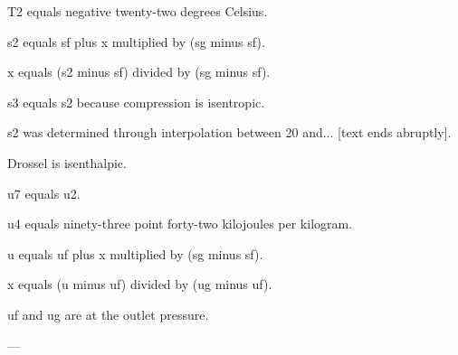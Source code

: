 T2 equals negative twenty-two degrees Celsius.  

s2 equals sf plus x multiplied by (sg minus sf).  

x equals (s2 minus sf) divided by (sg minus sf).  

s3 equals s2 because compression is isentropic.  

s2 was determined through interpolation between 20 and... [text ends abruptly].  

Drossel is isenthalpic.  

u7 equals u2.  

u4 equals ninety-three point forty-two kilojoules per kilogram.  

u equals uf plus x multiplied by (sg minus sf).  

x equals (u minus uf) divided by (ug minus uf).  

uf and ug are at the outlet pressure.  

---
